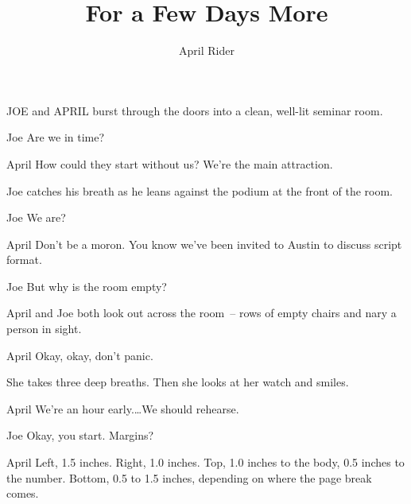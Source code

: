 \documentclass{screenplay}[2006/11/15]
\title{For a Few Days More}
\author{April Rider}
\begin{document}
\coverpage
\fadein
{}
JOE and APRIL burst through the doors into a clean, well-lit
seminar room.
\begin{dialogue}{Joe}
Are we in time?
\end{dialogue}
\begin{dialogue}{April}
How could they start without us?
We're the main attraction.
\end{dialogue}
Joe catches his breath as he leans against the podium at the
front of the room.
\begin{dialogue}{Joe}
We are?
\end{dialogue}
\begin{dialogue}{April}
Don't be a moron.  You know we've
been invited to Austin to discuss
script format.
\end{dialogue}
\begin{dialogue}{Joe}
But why is the room empty?
\end{dialogue}
April and Joe both look out across the room~-- rows of empty
chairs and nary a person in sight.
\begin{dialogue}{April}
Okay, okay, don't panic.
\end{dialogue}
She takes three deep breaths.  Then she looks at her watch
and smiles.
\begin{dialogue}[continuing]{April}
We're an hour early.\dots  We should
rehearse.
\end{dialogue}
\begin{dialogue}{Joe}
Okay, you start.  Margins?
\end{dialogue}
\begin{dialogue}{April}
Left, 1.5 inches.  Right, 1.0
inches.  Top, 1.0 inches to the
body, 0.5 inches to the number.
Bottom, 0.5 to 1.5 inches,
depending on where the page break
comes.
\end{dialogue}
\end{document}
